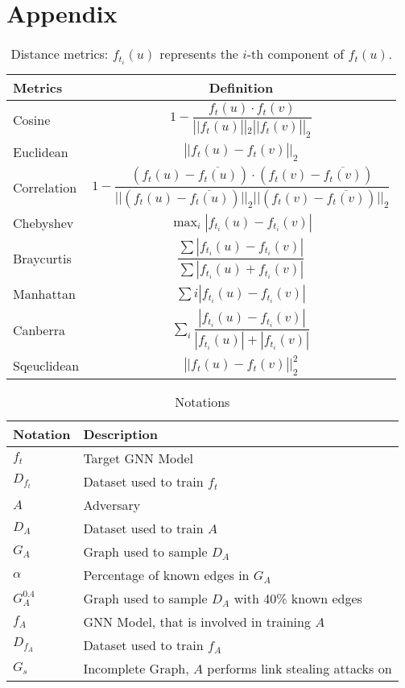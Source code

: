 \chapter*{Appendix}
    \begin{table}[h]
        \centering
        \footnotesize
        \begin{tabular}{l|c}
        \toprule
        Metrics & Definition \\
        \midrule
        Cosine & $1 - \dfrac{f_t(u)\cdot f_t(v)}{\left||f_t(u)\right||_2\left||f_t(v)\right||_2}$ \\
        Euclidean & $\left||f_t(u) - f_t(v)\right||_2$ \\
        Correlation & $1-\dfrac{(f_t(u)-\overline{f_t(u)}) \cdot(f_t(v)-\overline{f_t(v)})}{||(f_t(u)-\overline{f_t(u)})||_{2}||(f_t(v)-\overline{f_t(v)})||_{2}}$ \\
        Chebyshev & $\max _{i}\left|f_{t_i}(u)-f_{t_i}(v)\right|$ \\
        Braycurtis & $\dfrac{\sum\left|f_{t_i}(u)-f_{t_i}(v)\right|} {\sum\left|f_{t_i}(u)+f_{t_i}(v)\right|}$ \\
        Manhattan & $\sum{i}\left|f_{t_i}(u)-f_{t_i}(v)\right|$ \\
        Canberra & $\sum_{i} \dfrac{\left|f_{t_i}(u)-f_{t_i}(v)\right|}{\left|f_{t_i}(u)\right|+\left|f_{t_i}(v)\right|}$ \\
        Sqeuclidean & $\left||f_t(u) - f_t(v)\right||_2^2$ \\
        \bottomrule
        \end{tabular}
        \caption{Distance metrics: $f_{t_i}(u)$ represents the $i$-th component of $f_t(u)$.}
        \label{table:distance}
    \end{table}

    \begin{table}[!h]
        \centering
        \footnotesize
        \begin{tabular}{l|l|}
          \toprule
          Notation & Description \\
          \midrule
          $f_t$ & Target GNN Model \\
          $D_{f_t}$ & Dataset used to train $f_t$ \\
          $A$ & Adversary \\
          $D_A$ & Dataset used to train $A$ \\
          $G_A$ & Graph used to sample $D_A$ \\
          $\alpha$ & Percentage of known edges in $G_A$ \\
          $G_A^{0.4}$ & Graph used to sample $D_A$ with 40\% known edges \\
          $f_A$ & GNN Model, that is involved in training $A$ \\
          $D_{f_A}$ & Dataset used to train $f_A$ \\
          $G_s$ & Incomplete Graph, $A$ performs link stealing attacks on \\
          \bottomrule
        \end{tabular}
        \caption{Notations}
        \label{table:notations}
      \end{table}

